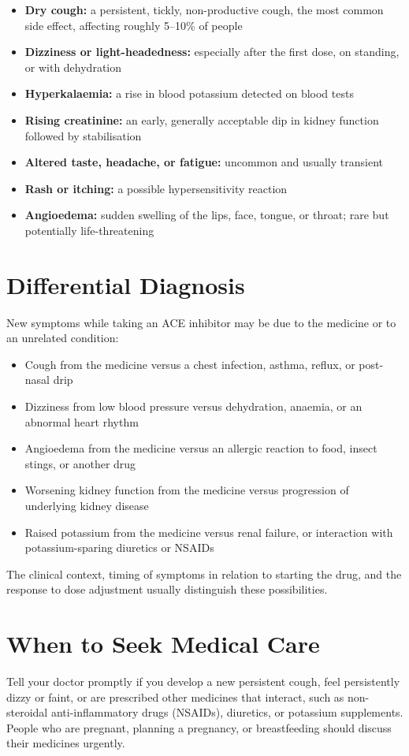 \begin{itemize}
    \item \textbf{Dry cough:} a persistent, tickly, non-productive cough, the most common side effect, affecting roughly 5--10\% of people
    \item \textbf{Dizziness or light-headedness:} especially after the first dose, on standing, or with dehydration
    \item \textbf{Hyperkalaemia:} a rise in blood potassium detected on blood tests
    \item \textbf{Rising creatinine:} an early, generally acceptable dip in kidney function followed by stabilisation
    \item \textbf{Altered taste, headache, or fatigue:} uncommon and usually transient
    \item \textbf{Rash or itching:} a possible hypersensitivity reaction
    \item \textbf{Angioedema:} sudden swelling of the lips, face, tongue, or throat; rare but potentially life-threatening
\end{itemize}

\section*{Differential Diagnosis}
New symptoms while taking an ACE inhibitor may be due to the medicine or to an unrelated condition:

\begin{itemize}
    \item Cough from the medicine versus a chest infection, asthma, reflux, or post-nasal drip
    \item Dizziness from low blood pressure versus dehydration, anaemia, or an abnormal heart rhythm
    \item Angioedema from the medicine versus an allergic reaction to food, insect stings, or another drug
    \item Worsening kidney function from the medicine versus progression of underlying kidney disease
    \item Raised potassium from the medicine versus renal failure, or interaction with potassium-sparing diuretics or NSAIDs
\end{itemize}

The clinical context, timing of symptoms in relation to starting the drug, and the response to dose adjustment usually distinguish these possibilities.

\section*{When to Seek Medical Care}
Tell your doctor promptly if you develop a new persistent cough, feel persistently dizzy or faint, or are prescribed other medicines that interact, such as non-steroidal anti-inflammatory drugs (NSAIDs), diuretics, or potassium supplements. People who are pregnant, planning a pregnancy, or breastfeeding should discuss their medicines urgently.

